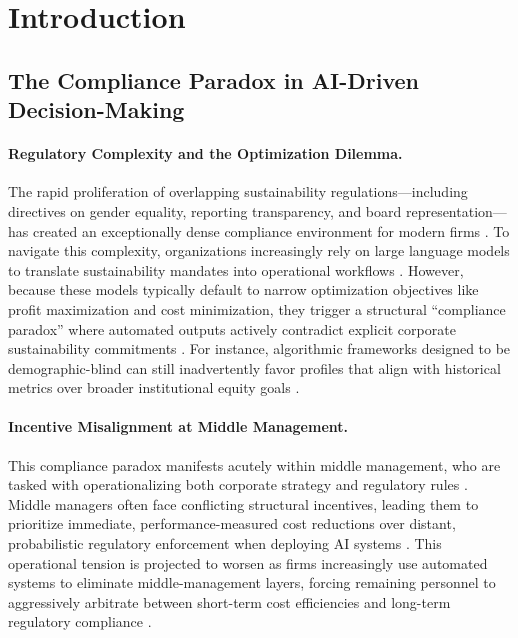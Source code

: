 \documentclass[pdflatex,sn-mathphys-num]{sn-jnl}%
\theoremstyle{thmstyleone}%
\theoremstyle{thmstyletwo}%
\theoremstyle{thmstylethree}%
\begin{document}
\section{Introduction}\label{sec1}

\subsection{The Compliance Paradox in AI-Driven Decision-Making}

\paragraph{Regulatory Complexity and the Optimization Dilemma.} The rapid
proliferation of overlapping sustainability regulations—including directives on
gender equality, reporting transparency, and board representation—has created an
exceptionally dense compliance environment for modern firms
\citep{europeancommission2022csrd, europeancommission2025taxonomy,
europeanparliament2022women, europeancommission2025equal,
sargsyan2025compliance}. To navigate this complexity, organizations increasingly
rely on large language models to translate sustainability mandates into
operational workflows \citep{storey2025generative}. However, because these
models typically default to narrow optimization objectives like profit
maximization and cost minimization, they trigger a structural ``compliance
paradox'' where automated outputs actively contradict explicit corporate
sustainability commitments \citep{sargsyan2025compliance}. For instance,
algorithmic frameworks designed to be demographic-blind can still inadvertently
favor profiles that align with historical metrics over broader institutional
equity goals \citep{kaygin2023human}.

\paragraph{Incentive Misalignment at Middle Management.} This compliance paradox
manifests acutely within middle management, who are tasked with operationalizing
both corporate strategy and regulatory rules \citep{sargsyan2025compliance}.
Middle managers often face conflicting structural incentives, leading them to
prioritize immediate, performance-measured cost reductions over distant,
probabilistic regulatory enforcement when deploying AI systems
\citep{sargsyan2025compliance}. This operational tension is projected to worsen
as firms increasingly use automated systems to eliminate middle-management
layers, forcing remaining personnel to aggressively arbitrate between short-term
cost efficiencies and long-term regulatory compliance
\citep{theeconomist2024gartner}.
\end{document}
